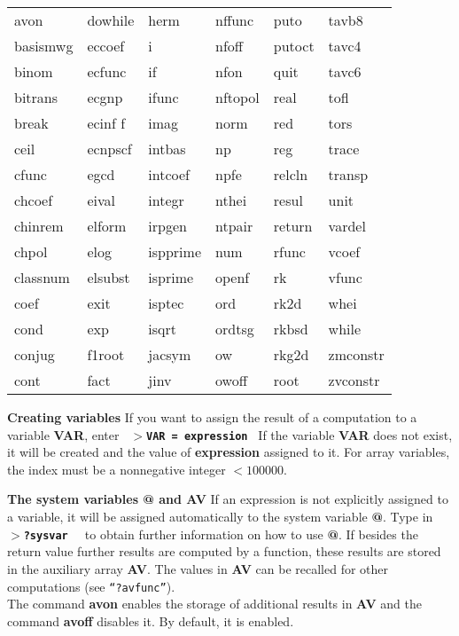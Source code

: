 {\begin{tabular}{p{0.8in}p{0.8in}p{0.8in}p{0.8in}p{0.9in}p{0.8in}}
avon     & dowhile   & herm      & nffunc   & puto      & tavb8    \\
basismwg & eccoef    & i         & nfoff    & putoct    & tavc4    \\
binom    & ecfunc    & if        & nfon     & quit      & tavc6    \\
bitrans  & ecgnp     & ifunc     & nftopol  & real      & tofl     \\
break    & ecinf f   & imag      & norm     & red       & tors     \\
ceil     & ecnpscf   & intbas    & np       & reg       & trace    \\
cfunc    & egcd      & intcoef   & npfe     & relcln    & transp   \\   
chcoef   & eival     & integr    & nthei    & resul     & unit     \\
chinrem  & elform    & irpgen    & ntpair   & return    & vardel   \\
chpol    & elog      & ispprime  & num      & rfunc     & vcoef    \\
classnum & elsubst   & isprime   & openf    & rk        & vfunc    \\
coef     & exit      & isptec    & ord      & rk2d      & whei     \\
cond     & exp       & isqrt     & ordtsg   & rkbsd     & while    \\
conjug   & f1root    & jacsym    & ow       & rkg2d     & zmconstr \\
cont     & fact      & jinv      & owoff    & root      & zvconstr \\
\end{tabular}
}

\newpage

{\bf Creating variables}
\leer
 If you want to assign the result of a computation to a variable {\bf VAR}, enter
\leer
{\tt 
  $>${\bf VAR = expression} \care {}  \care
}
\leer
If the variable {\bf VAR} does not exist, it will be created and the value of
{\bf expression} assigned to it. For array variables, the index must be a nonnegative
integer $< 100000$.

\leer\leer
{\bf The system variables @ and AV}
\leer
If an expression is not explicitly assigned to a variable, it will be assigned
automatically to the system variable {\bf @}. Type in
\leer
{\tt
  {\bf $>$?sysvar \care}
}
\leer
to obtain further information on how to use {\bf @}.
\leer
If besides the return value further results are computed by
a function, these results are stored in the auxiliary array {\bf AV}.
The values in {\bf AV} can be recalled for other computations
(see {\tt ``?avfunc''}).\\
The command {\bf avon} enables the storage of additional results in
{\bf AV} and the command {\bf avoff} disables it.  By default, it is
enabled.

